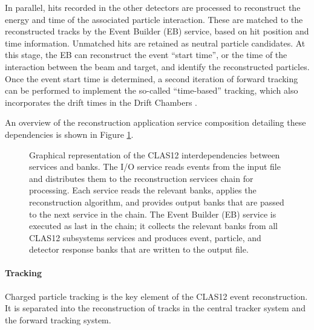     In parallel, hits recorded in the other detectors are processed to reconstruct the energy and time of the associated particle interaction.
    These are matched to the reconstructed tracks by the Event Builder (EB) service, based on hit
    position and time information.
    Unmatched hits are retained as neutral particle candidates.
    At this stage, the EB can reconstruct the event ``start time'', or the time of the interaction between the beam and target, and identify the reconstructed particles.
    Once the event start time is determined, a second iteration of forward tracking can be performed to implement the so-called ``time-based'' tracking, which also incorporates the drift times in the Drift Chambers \cite{ziegler2020}.

    An overview of the reconstruction application service composition detailing these dependencies is shown in Figure \ref{fig::recon_chain}.

    \begin{figure}[t]
        \centering{}
        \caption[CLAS12 Reconstruction Chain.]{Graphical representation of the CLAS12 interdependencies between services and banks.
        The I/O service reads events from the input file and distributes them to the reconstruction services chain for processing.
        Each service reads the relevant banks, applies the reconstruction algorithm, and provides output banks that are passed to the next service in the chain.
        The Event Builder (EB) service is executed as last in the chain; it collects the relevant banks from all CLAS12 subsystems services and produces event, particle, and detector response banks that are written to the output file.}
        \label{fig::recon_chain}
    \end{figure}

\paragraph{Tracking}
    Charged particle tracking is the key element of the CLAS12 event reconstruction.
    It is separated into the reconstruction of tracks in the central tracker system and the forward tracking system.

